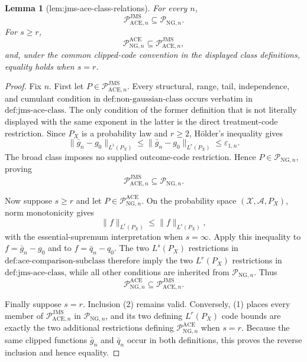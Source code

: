 \documentclass{article}
\newtheorem{lemma}{Lemma}
\begin{document}
\begin{lemma}[lem:jms-ace-class-relations]\label{lem:jms-ace-class-relations}
For every \(n\),
\[
 \mathcal P_{\mathrm{ACE},n}^{\mathrm{JMS}}
 \subseteq \mathcal P_{\mathrm{NG},n}.
\]
For \(s\ge r\),
\[
 \mathcal P_{\mathrm{NG},n}^{\mathrm{ACE}}
 \subseteq \mathcal P_{\mathrm{ACE},n}^{\mathrm{JMS}},
\]
and, under the common clipped-code convention in the displayed class definitions, equality holds when \(s=r\).
\end{lemma}
\begin{proof}
Fix \(n\).  First let \(P\in\mathcal P_{\mathrm{ACE},n}^{\mathrm{JMS}}\).  Every structural, range, tail, independence, and cumulant condition in \(\text{def:non-gaussian-class}\) occurs verbatim in \(\text{def:jms-ace-class}\).  The only condition of the former definition that is not literally displayed with the same exponent in the latter is the direct treatment-code restriction.  Since \(P_X\) is a probability law and \(r\ge2\), H\"older's inequality gives
\[
 \|\bar g_n-g_0\|_{L^1(P_X)}
 \le \|\bar g_n-g_0\|_{L^r(P_X)}
 \le \varepsilon_{1,n}.
\]
The broad class imposes no supplied outcome-code restriction.  Hence \(P\in\mathcal P_{\mathrm{NG},n}\), proving
\[
 \mathcal P_{\mathrm{ACE},n}^{\mathrm{JMS}}
 \subseteq\mathcal P_{\mathrm{NG},n}. \tag{1}
\]

Now suppose \(s\ge r\) and let \(P\in\mathcal P_{\mathrm{NG},n}^{\mathrm{ACE}}\).  On the probability space \((\mathcal X,\mathcal A,P_X)\), norm monotonicity gives
\[
 \|f\|_{L^r(P_X)}\le \|f\|_{L^s(P_X)},
\]
with the essential-supremum interpretation when \(s=\infty\).  Apply this inequality to \(f=\bar g_n-g_0\) and to \(f=\bar q_n-q_0\).  The two \(L^s(P_X)\) restrictions in \(\text{def:ace-comparison-subclass}\) therefore imply the two \(L^r(P_X)\) restrictions in \(\text{def:jms-ace-class}\), while all other conditions are inherited from \(\mathcal P_{\mathrm{NG},n}\).  Thus
\[
 \mathcal P_{\mathrm{NG},n}^{\mathrm{ACE}}
 \subseteq\mathcal P_{\mathrm{ACE},n}^{\mathrm{JMS}}. \tag{2}
\]

Finally suppose \(s=r\).  Inclusion (2) remains valid.  Conversely, (1) places every member of \(\mathcal P_{\mathrm{ACE},n}^{\mathrm{JMS}}\) in \(\mathcal P_{\mathrm{NG},n}\), and its two defining \(L^r(P_X)\) code bounds are exactly the two additional restrictions defining \(\mathcal P_{\mathrm{NG},n}^{\mathrm{ACE}}\) when \(s=r\).  Because the same clipped functions \(\bar g_n\) and \(\bar q_n\) occur in both definitions, this proves the reverse inclusion and hence equality.
\end{proof}
\end{document}
